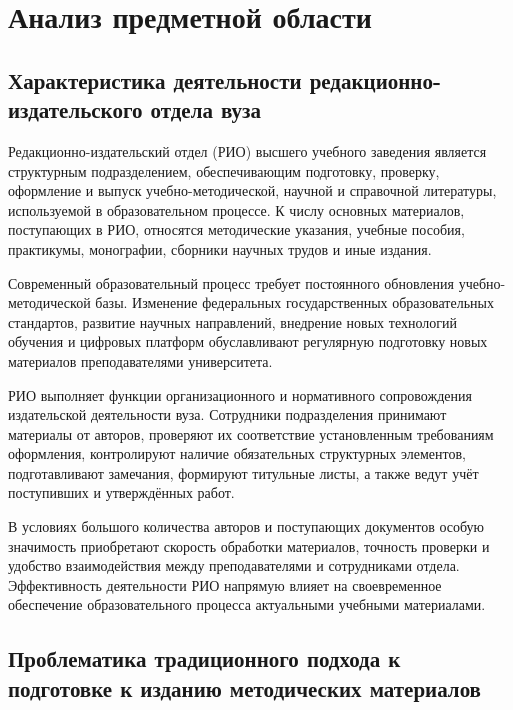 \section{Анализ предметной области}

\subsection{Характеристика деятельности редакционно-издательского отдела вуза}

Редакционно-издательский отдел (РИО) высшего учебного заведения является структурным подразделением, обеспечивающим подготовку, проверку, оформление и выпуск учебно-методической, научной и справочной литературы, используемой в образовательном процессе. К числу основных материалов, поступающих в РИО, относятся методические указания, учебные пособия, практикумы, монографии, сборники научных трудов и иные издания.

Современный образовательный процесс требует постоянного обновления учебно-методической базы. Изменение федеральных государственных образовательных стандартов, развитие научных направлений, внедрение новых технологий обучения и цифровых платформ обуславливают регулярную подготовку новых материалов преподавателями университета.

РИО выполняет функции организационного и нормативного сопровождения издательской деятельности вуза. Сотрудники подразделения принимают материалы от авторов, проверяют их соответствие установленным требованиям оформления, контролируют наличие обязательных структурных элементов, подготавливают замечания, формируют титульные листы, а также ведут учёт поступивших и утверждённых работ.

В условиях большого количества авторов и поступающих документов особую значимость приобретают скорость обработки материалов, точность проверки и удобство взаимодействия между преподавателями и сотрудниками отдела. Эффективность деятельности РИО напрямую влияет на своевременное обеспечение образовательного процесса актуальными учебными материалами.

\subsection{Проблематика традиционного подхода к подготовке к изданию методических материалов}

